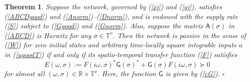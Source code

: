 \documentclass[letterpaper, 10pt, conference]{ieeeconf}  %
\newtheorem{thm}{Theorem}
\def\mR{\mathbb{R}}    %
\def\x{\times}
\def\sA{\mathsf{A}}
\def\sG{\mathsf{G}}
\def\mT{\mathbb{T}}
\begin{document}
\begin{thm}
\label{th:pass}
Suppose the network, governed by (\ref{xj}) and (\ref{yj}), satisfies (\ref{ABCDgood}) and (\ref{Anorm})--(\ref{Dnorm}), and is endowed with the supply rate (\ref{S}) subject to (\ref{Ggood}) and (\ref{Gnorm}). Also, suppose the matrix $\sA(\sigma)$ in (\ref{ABCD}) is Hurwitz for any $\sigma \in \mT^\nu$. Then the network is passive in the sense of (\ref{W})  for zero initial states and arbitrary time-locally square integrable inputs $u$ in (\ref{ugoodT}) if and only if its
spatio-temporal transfer function (\ref{F}) satisfies
\begin{equation}
\label{FGpos}
  E(\omega, \sigma)
  :=
  F(i\omega,\sigma)^*\sG(\sigma)^*
  +
  \sG(\sigma)F(i\omega,\sigma)
  \succcurlyeq
  0
\end{equation}
for almost all $(\omega,\sigma) \in \mR\x \mT^\nu$. Here, the function $\sG$ is given by (\ref{cG}).
\hfill$\square$
\end{thm}
\end{document}
